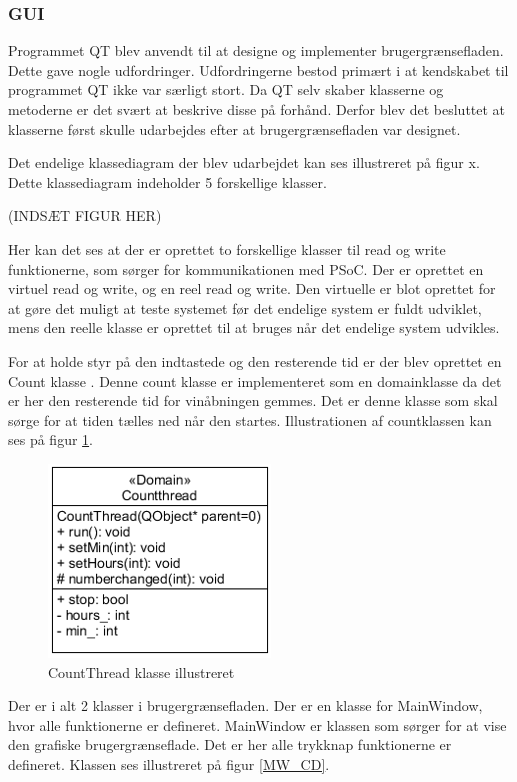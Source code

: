 \subsubsection{GUI}

Programmet QT blev anvendt til at designe og implementer brugergrænsefladen. Dette gave nogle udfordringer. Udfordringerne bestod primært i at kendskabet til programmet QT ikke var særligt stort. Da QT selv skaber klasserne og metoderne er det svært at beskrive disse på forhånd. Derfor blev det besluttet at klasserne først skulle udarbejdes efter at brugergrænsefladen var designet.

Det endelige klassediagram der blev udarbejdet kan ses illustreret på figur x. Dette klassediagram indeholder 5 forskellige klasser.

(INDSÆT FIGUR HER)

Her kan det ses at der er oprettet to forskellige klasser til read og write funktionerne, som sørger for kommunikationen med PSoC. Der er oprettet en virtuel read og write, og en reel read og write. Den virtuelle er blot oprettet for at gøre det muligt at teste systemet før det endelige system er fuldt udviklet, mens den reelle klasse er oprettet til at bruges når det endelige system udvikles.

For at holde styr på den indtastede og den resterende tid er der blev oprettet en Count klasse . Denne count klasse er implementeret som en domainklasse da det er her den resterende tid for vinåbningen gemmes. Det er denne klasse som skal sørge for at tiden tælles ned når den startes. Illustrationen af countklassen kan ses på figur \ref{CT_CD}.

\begin{figure}[H]
	\centerline{\includegraphics[scale=1]{tex/Design/GUI/Fotos/CountThread}}
	\caption{CountThread klasse illustreret}
	\label{CT_CD}
\end{figure}

Der er i alt 2 klasser i brugergrænsefladen. Der er en klasse for MainWindow, hvor alle funktionerne er defineret. MainWindow er klassen som sørger for at vise den grafiske brugergrænseflade. Det er her alle trykknap funktionerne er defineret. Klassen ses illustreret på figur \ref{MW_CD}. 

